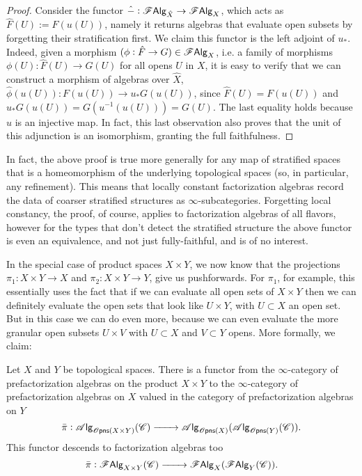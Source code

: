 \documentclass[../text.tex]{subfiles}
\begin{document}
\begin{proof}
    Consider the functor $\hat{-}: \mathscr{F} \mathsf{Alg}_{\hat{X}} \rightarrow \mathscr{F} \mathsf{Alg}_{X}$, which acts as $\hat{F}(U) := F(u(U))$, namely it returns algebras that evaluate open subsets by forgetting their stratification first. We claim this functor is the left adjoint of $u_*$. Indeed, given a morphism $(\phi: \hat{F} \rightarrow G) \in \mathscr{F} \mathsf{Alg}_{X}$, i.e. a family of morphisms $\phi(U): \hat{F}(U) \rightarrow G(U)$ for all opens $U$ in $X$, it is easy to verify that we can construct a morphism of algebras over $\hat{X}$, $\hat{\phi}(u(U)): F(u(U)) \rightarrow u_*G (u(U))$, since $\hat{F}(U) = F(u(U))$ and $u_*G(u(U)) = G(u^{-1}(u(U))) = G(U)$. The last equality holds because $u$ is an injective map. In fact, this last observation also proves that the unit of this adjunction is an isomorphism, granting the full faithfulness.
\end{proof}

\begin{remark}
    In fact, the above proof is true more generally for any map of stratified spaces that is a homeomorphism of the underlying topological spaces (so, in particular, any refinement). This means that locally constant factorization algebras record the data of coarser stratified structures as $\infty$-subcategories. Forgetting local constancy, the proof, of course, applies to factorization algebras of all flavors, however for the types that don't detect the stratified structure the above functor is even an equivalence, and not just fully-faithful, and is of no interest.
\end{remark}



In the special case of product spaces $X \times Y$, we now know that the projections $\pi_1: X \times Y \rightarrow X$ and $\pi_2: X \times Y \rightarrow Y$, give us pushforwards. For $\pi_1$, for example, this essentially uses the fact that if we can evaluate all open sets of $X \times Y$ then we can definitely evaluate the open sets that look like $U \times Y$, with $U \subset X$ an open set. But in this case we can do even more, because we can even evaluate the more granular open subsets $U \times V$ with $U \subset X$ and $V \subset Y$ opens. More formally, we claim:
%
\begin{proposition}\label{prop:exp_of_products}
    Let $X$ and $Y$ be topological spaces. There is a functor from the $\infty$-category of prefactorization algebras on the product $X \times Y$ to the $\infty$-category of prefactorization algebras on $X$ valued in the category of prefactorization algebras on $Y$
    \begin{equation}
        \bar{\pi}: \alg{\opens(X \times Y)}(\catC) \xrightarrow{\qquad} \alg{\opens(X)} (\alg{\opens(Y)} (\catC)).
    \end{equation}
    This functor descends to factorization algebras too
    \begin{equation}
        \bar{\pi}: \mathscr{F} \mathsf{Alg}_{X \times Y}(\mathscr{C}) \xrightarrow{\qquad} \mathscr{F} \mathsf{Alg}_{X}(\mathscr{F} \mathsf{Alg}_{Y}(\mathscr{C})).
    \end{equation}
\end{proposition}
\end{document}
